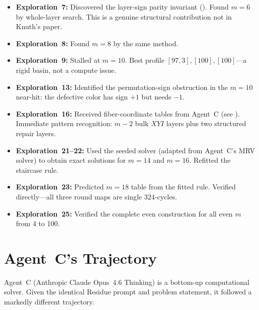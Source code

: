 \documentclass[11pt]{article}
\theoremstyle{definition}
\theoremstyle{remark}
\begin{document}
\begin{itemize}
    \item \textbf{Exploration~7:} Discovered the layer-sign parity invariant (). Found $m = 6$ by whole-layer search. This is a genuine structural contribution not in Knuth's paper.
    \item \textbf{Exploration~8:} Found $m = 8$ by the same method.
    \item \textbf{Exploration~9:} Stalled at $m = 10$. Best profile $[97, 3], [100], [100]$---a rigid basin, not a compute issue.
    \item \textbf{Exploration~13:} Identified the permutation-sign obstruction in the $m = 10$ near-hit: the defective color has sign $+1$ but needs $-1$.
    \item \textbf{Exploration~16:} Received fiber-coordinate tables from Agent~C (see ). Immediate pattern recognition: $m-2$ bulk $XYI$ layers plus two structured repair layers.
    \item \textbf{Exploration~21--22:} Used the seeded solver (adapted from Agent~C's MRV solver) to obtain exact solutions for $m = 14$ and $m = 16$. Refitted the staircase rule.
    \item \textbf{Exploration~23:} Predicted $m = 18$ table from the fitted rule. Verified directly---all three round maps are single $324$-cycles.
    \item \textbf{Exploration~25:} Verified the complete even construction for all even $m$ from 4 to 100.
\end{itemize}

\section{Agent~C's Trajectory}
\label{sec:slow}

Agent~C (Anthropic Claude Opus~4.6 Thinking) is a bottom-up computational solver. Given the identical Residue prompt and problem statement, it followed a markedly different trajectory.
\end{document}
